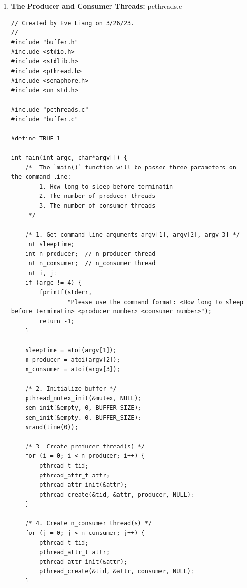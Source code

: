 \documentclass[12pt]{article}
\newenvironment{sol}[1][Solution]{\begin{trivlist}\item[\hskip\labelsep {\bfseries #1:}]}{\end{trivlist}}
\begin{document}
\begin{sol}
\begin{enumerate}
\begin{verbatim}
    /* 4. Create n_consumer thread(s) */
    for (j = 0; j < n_consumer; j++) {
        pthread_t tid;
        pthread_attr_t attr;
        pthread_attr_init(&attr);
        pthread_create(&tid, &attr, consumer, NULL);
    }

    /* 5. Sleep */
    sleep(sleepTime);

    /* 6 Exit */
    return 0;
}
        
    \end{verbatim}
    \item[(d)] \textbf{The Producer and Consumer Threads:} pcthreads.c
            \begin{verbatim}
// Created by Eve Liang on 3/26/23.
//
#include "buffer.h"
#include <stdio.h>
#include <stdlib.h>
#include <pthread.h>
#include <semaphore.h>
#include <unistd.h>

#include "pcthreads.c"
#include "buffer.c"

#define TRUE 1

int main(int argc, char*argv[]) {
    /*  The `main()` function will be passed three parameters on the command line:
        1. How long to sleep before terminatin
        2. The number of producer threads
        3. The number of consumer threads
     */

    /* 1. Get command line arguments argv[1], argv[2], argv[3] */
    int sleepTime;
    int n_producer;  // n_producer thread
    int n_consumer;  // n_consumer thread
    int i, j;
    if (argc != 4) {
        fprintf(stderr,
                "Please use the command format: <How long to sleep before terminatin> <producer number> <consumer number>");
        return -1;
    }

    sleepTime = atoi(argv[1]);
    n_producer = atoi(argv[2]);
    n_consumer = atoi(argv[3]);

    /* 2. Initialize buffer */
    pthread_mutex_init(&mutex, NULL);
    sem_init(&empty, 0, BUFFER_SIZE);
    sem_init(&empty, 0, BUFFER_SIZE);
    srand(time(0));

    /* 3. Create producer thread(s) */
    for (i = 0; i < n_producer; i++) {
        pthread_t tid;
        pthread_attr_t attr;
        pthread_attr_init(&attr);
        pthread_create(&tid, &attr, producer, NULL);
    }

    /* 4. Create n_consumer thread(s) */
    for (j = 0; j < n_consumer; j++) {
        pthread_t tid;
        pthread_attr_t attr;
        pthread_attr_init(&attr);
        pthread_create(&tid, &attr, consumer, NULL);
    }


\end{verbatim}
\end{enumerate}
\end{sol}
\end{document}
